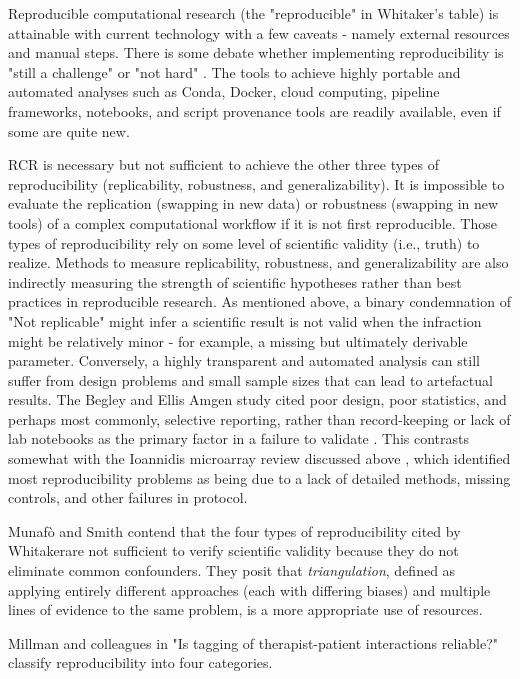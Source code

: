 \documentclass{drexelthesis}
\begin{document}
Reproducible computational research (the "reproducible" in Whitaker's table) is attainable with current technology with a few caveats - namely external resources and manual steps. There is some debate whether implementing reproducibility is "still a challenge" \cite{FitzJohn2014-wk}  or "not hard" \cite{Edzer_Pebesma2016-gl}. The tools to achieve highly portable and automated analyses such as Conda, Docker, cloud computing, pipeline frameworks, notebooks, and script provenance tools are readily available, even if some are quite new. 

RCR is necessary but not sufficient to achieve the other three types of reproducibility (replicability, robustness, and generalizability). It is impossible to evaluate the replication (swapping in new data) or robustness (swapping in new tools) of a complex computational workflow if it is not first reproducible. Those types of reproducibility rely on some level of scientific validity (i.e., truth) to realize. Methods to measure replicability, robustness, and generalizability are also indirectly measuring the strength of scientific hypotheses rather than best practices in reproducible research. As mentioned above, a binary condemnation of "Not replicable" might infer a scientific result is not valid when the infraction might be relatively minor - for example, a missing but ultimately derivable parameter. Conversely, a highly transparent and automated analysis can still suffer from design problems and small sample sizes that can lead to artefactual results. The Begley and Ellis Amgen study cited poor design, poor statistics, and perhaps most commonly, selective reporting, rather than record-keeping or lack of lab notebooks as the primary factor in a failure to validate \cite{Begley2012-mt}. This contrasts somewhat with the Ioannidis microarray review discussed above \cite{Ioannidis2009-at}, which identified most reproducibility problems as being due to a lack of detailed methods, missing controls, and other failures in protocol.

Munafò and Smith contend that the four types of reproducibility cited by Whitakerare not sufficient to verify scientific validity because they do not eliminate common confounders. They posit that \textit{triangulation}, defined as applying entirely different approaches (each with differing biases) and multiple lines of evidence to the same problem, is a more appropriate use of resources.\cite{noauthor_undated-xz} 

Millman and colleagues in "Is tagging of therapist-patient interactions reliable?" \cite{jarrod} classify reproducibility into four categories. 
\end{document}
